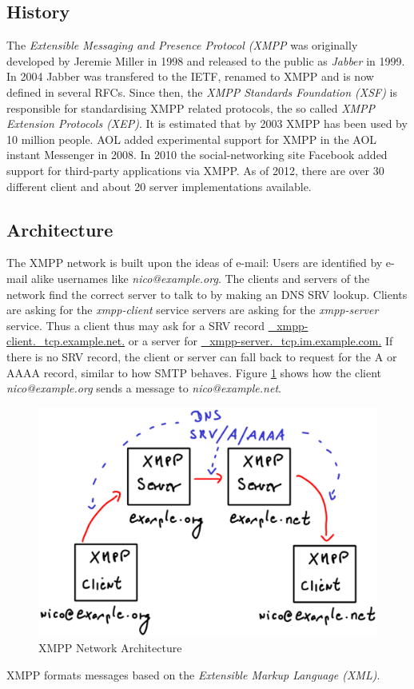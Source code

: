 \subsection{History}
The \textit{Extensible Messaging and Presence Protocol (XMPP}
was originally developed by Jeremie Miller in 1998 and released
to the public as \textit{Jabber} in 1999. In 2004 Jabber
was transfered to the IETF, renamed to XMPP
and is now defined in several
RFCs.\cite{rfc3920,rfc3921,rfc3922,rfc3923,rfc4622,rfc4854,rfc4979,rfc6120,rfc6121}
Since then, the \textit{XMPP Standards Foundation (XSF)} is responsible
for standardising XMPP related protocols, the so called 
\textit{XMPP Extension Protocols (XEP)}.
It is estimated that by 2003 XMPP has been used by 10 million people.\cite{xmppuser}
AOL added experimental support for XMPP in the AOL instant Messenger in 2008.
In 2010 the social-networking site Facebook added support for
third-party applications via XMPP.
As of 2012, there are over 30 different client and about 20
server implementations available.
\subsection{Architecture}
The XMPP network is built upon the ideas of e-mail: Users are identified
by e-mail alike usernames like \textit{nico@example.org}. The clients and
servers of the network find the correct server to talk to by making an
DNS SRV\cite{rfc2782} lookup. 
Clients are asking for the \textit{xmpp-client} service
servers are asking for the \textit{xmpp-server} service.
Thus a client thus may ask for a SRV record
\url{_xmpp-client._tcp.example.net.} or a server for
\url{_xmpp-server._tcp.im.example.com.}
If there is no SRV record, the client or server can fall back
to request for the A or AAAA record, similar to how 
SMTP\cite{rfc2821} behaves. Figure \ref{jabberarch} shows
how the client \textit{nico@example.org} sends a message
to \textit{nico@example.net}.
\begin{figure}
    \centering
    \caption{XMPP Network Architecture}
    \label{jabberarch}
    \includegraphics[scale=0.8]{jabberarch.eps}
\end{figure}
XMPP formats messages based on the 
\textit{Extensible Markup Language (XML)}.

